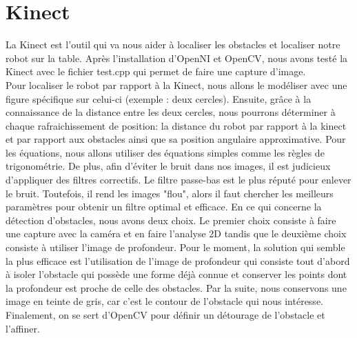 \section{Kinect}
La Kinect est l’outil qui va nous aider à localiser les obstacles et localiser notre robot sur la table. Après l’installation d’OpenNI et OpenCV, nous avons testé la Kinect avec le fichier test.cpp qui permet de faire une capture d’image.\\
Pour localiser le robot par rapport à la Kinect, nous allons le modéliser avec une figure spécifique sur celui-ci (exemple : deux cercles). Ensuite, grâce à la connaissance de la distance entre les deux cercles, nous pourrons déterminer à chaque rafraichissement de position: la distance du robot par rapport à la kinect et par rapport aux obstacles ainsi que sa position angulaire approximative. Pour les équations, nous allons utiliser des équations simples comme les règles de trigonométrie. De plus, afin d'éviter le bruit dans nos images, il est judicieux d'appliquer des filtres correctifs. Le filtre passe-bas est le plus réputé pour enlever le bruit. Toutefois, il rend les images "flou", alors il faut chercher les meilleurs paramètres pour obtenir un filtre optimal et efficace. En ce qui concerne la détection d’obstacles, nous avons deux choix. Le premier choix consiste à faire une capture avec la caméra et en faire l’analyse 2D tandis que le deuxième choix consiste à utiliser l’image de profondeur. Pour le moment, la solution qui semble la plus efficace est l’utilisation de l’image de profondeur qui consiste tout d'abord à isoler l'obstacle qui possède une forme déjà connue et conserver les points dont la profondeur est proche de celle des obstacles. Par la suite, nous conservons une image en teinte de gris, car c'est le contour de l'obstacle qui nous intéresse. Finalement, on se sert d'OpenCV pour définir un détourage de l'obstacle et l'affiner. 
